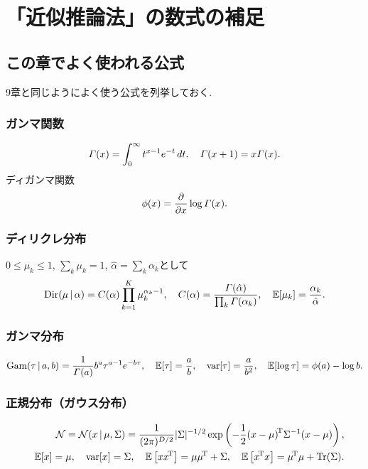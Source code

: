 \setcounter{chapter}{9}
\chapter{「近似推論法」の数式の補足}
\section{この章でよく使われる公式}
9章と同じようによく使う公式を列挙しておく.
\subsection{ガンマ関数}
$$
\varGamma(x)=\int_0^\infty t^{x-1} e^{-t}\,dt, \quad \varGamma(x+1)=x\varGamma(x).
$$
ディガンマ関数
$$
\phi(x)=\frac{\partial}{\partial x} \log \varGamma(x).
$$
\vspace{0pt}

\subsection{ディリクレ分布}
$0 \le \mu_k \le 1$, $\sum_k \mu_k = 1$, $\hat{\alpha}=\sum_k \alpha_k$として
$$
\mathop{\mathrm{Dir}}\nolimits(\mu\,|\,\alpha)=C(\alpha)\prod_{k=1}^K \mu_k ^{\alpha_k-1}, \quad C(\alpha)=\frac{\varGamma(\hat{\alpha})}{\prod_k \varGamma(\alpha_k)}, \quad
\mathbb{E}[\mu_k]=\frac{\alpha_k}{\hat{\alpha}}.
$$
\vspace{0pt}

\subsection{ガンマ分布}
$$
\mathop{\mathrm{Gam}}\nolimits(\tau\,|\,a,b)=\frac{1}{\varGamma(a)}b^a\tau^{a-1}e^{-b\tau}, \quad
\mathbb{E}[\tau]=\frac{a}{b}, \quad \mathop{\mathrm{var}}\nolimits[\tau]=\frac{a}{b^2}, \quad \mathbb{E}[\log \tau]=\phi(a)-\log b.
$$
\vspace{0pt}

\subsection{正規分布（ガウス分布）}
\begin{eqnarray*}&&
  {\cal N} = {\cal N}(x\,|\,\mu,\Sigma)
  = \frac{1}{(2\pi)^{D/2}}|\Sigma|^{-1/2}
    \exp\left(-\frac{1}{2}{(x-\mu)}^{\!\mathrm{T}} {\Sigma^{-1}} {(x-\mu)}\right),
\\&&
  \mathbb{E}[x] = \mu, \quad
  \mathop{\mathrm{var}}\nolimits[x] = \Sigma, \quad
  \mathbb{E}\left[x{x}^{\!\mathrm{T}}\right] = \mu{\mu}^{\!\mathrm{T}}+\Sigma, \quad
  \mathbb{E}\left[{x}^{\!\mathrm{T}}x\right] = {\mu}^{\!\mathrm{T}}\mu+\mathop{\mathrm{Tr}}\nolimits(\Sigma).
\end{eqnarray*}

